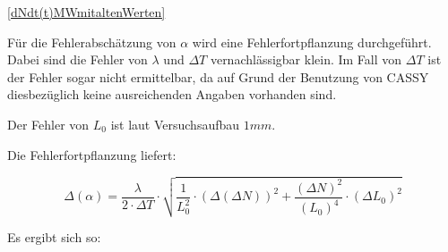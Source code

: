 \ref{dNdt(t)MWmitaltenWerten}

Für die Fehlerabschätzung von $ \alpha $ wird eine Fehlerfortpflanzung durchgeführt.
Dabei sind die Fehler von $ \lambda $  und  $ \Delta T $ vernachlässigbar klein. Im Fall von $ \Delta T $ ist der Fehler sogar nicht ermittelbar, da auf Grund der Benutzung von CASSY diesbezüglich keine ausreichenden Angaben vorhanden sind.

Der Fehler von $ L_{0} $ ist laut Versuchsaufbau $ 1 mm $.

Die Fehlerfortpflanzung liefert:

\begin{equation}
\Delta (\alpha) = \frac{\lambda}{2 \cdot \Delta T} \cdot \sqrt{\frac{1}{L_{0}^{2}} \cdot (\Delta(\Delta N))^{2} + \frac{(\Delta N)^{2}}{(L_{0})^{4}} \cdot (\Delta L_{0})^{2}}
\end{equation}


Es ergibt sich so:

